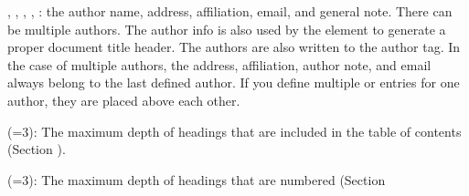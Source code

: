 \documentclass{book}
\begin{document}
\begin{mdUl}[class={list-star,loose},data-line={2155}]
\begin{mdLi}[data-line={2161}]
\begin{mdPre}[class={para-block,pre-fenced},data-line={2163},data-line-code={2164}]
%
\end{mdPre}%
\end{mdLi}%
\begin{mdLi}[data-line={2167}]%
\begin{mdP}[data-line={2167}]%
{}%
{}, %
{}%
{}, %
{}%
{}, %
{}%
{}, %
{}%
{}: the author
  name, address, affiliation, email, and general note. There can be
  multiple authors. The author info is also used by the %
{}\mdCode[class={code,code1}]{[TITLE]}%
{}
  element to generate a proper document title header. The authors are
  also written to the author %
{}%
{} tag. In the case of multiple
  authors, the address, affiliation, author note, and email always
  belong to the last defined author. If you define multiple 
{}%
{} or %
{}%
{} entries for one author, they are placed
  above each other.%
\end{mdP}%
\end{mdLi}%
\begin{mdLi}[data-line={2177}]%
\begin{mdP}[data-line={2177}]%
{}%
{} (=3): The maximum depth of headings that are included in the
  table of contents (Section%
{}{\mdNbsp}%
{}).%
\end{mdP}%
\end{mdLi}%
\begin{mdLi}[data-line={2180}]%
\begin{mdP}[data-line={2180}]%
{}%
{} (=3): The maximum depth of headings that are numbered (Section%

\end{mdP}
\end{mdLi}
\end{mdUl}
\end{document}
